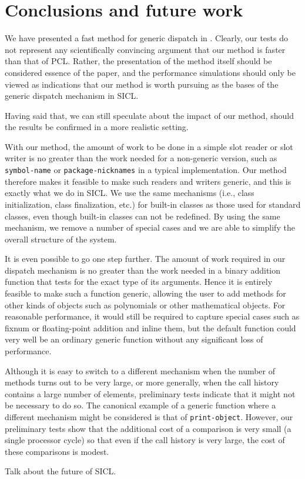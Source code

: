 \section{Conclusions and future work}

We have presented a fast method for generic dispatch in \cl{}.
Clearly, our tests do not represent any scientifically convincing
argument that our method is faster than that of PCL.  Rather, the
presentation of the method itself should be considered essence of the
paper, and the performance simulations should only be viewed as
indications that our method is worth pursuing as the bases of the
generic dispatch mechanism in SICL. 

Having said that, we can still speculate about the impact of our
method, should the results be confirmed in a more realistic setting. 

With our method, the amount of work to be done in a simple slot reader
or slot writer is no greater than the work needed for a non-generic
version, such as \texttt{symbol-name} or \texttt{package-nicknames} in
a typical \cl{} implementation.  Our method therefore makes it
feasible to make such readers and writers generic, and this is exactly
what we do in SICL.  We use the same \clos{} mechanisms (i.e., class
initialization, class finalization, etc.) for built-in classes as
those used for standard classes, even though built-in classes can not
be redefined.  By using the same mechanism, we remove a number of
special cases and we are able to simplify the overall structure of the
system. 

It is even possible to go one step further.  The amount of work
required in our dispatch mechanism is no greater than the work needed
in a binary addition function that tests for the exact type of its
arguments.  Hence it is entirely feasible to make such a function
generic, allowing the user to add methods for other kinds of objects
such as polynomials or other mathematical objects.  For reasonable
performance, it would still be required to capture special cases such
as fixnum or floating-point addition and inline them, but the default
function could very well be an ordinary generic function without any
significant loss of performance. 

Although it is easy to switch to a different mechanism when the number
of methods turns out to be very large, or more generally, when the
call history contains a large number of elements, preliminary tests
indicate that it might not be necessary to do so.  The canonical
example of a generic function where a different mechanism might be
considered is that of \texttt{print-object}.  However, our preliminary
tests show that the additional cost of a comparison is very small (a
single processor cycle) so that even if the call history is very
large, the cost of these comparisons is modest. 

Talk about the future of SICL.
 
